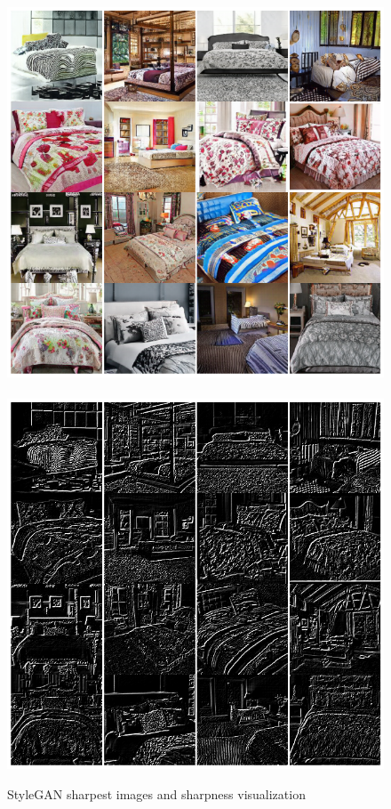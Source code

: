 \documentclass{article}
\begin{document}
        \begin{figure}[H]
          \centering
          \includegraphics[scale=0.28]{sharpness-images/moresharpness_style.png}
          \ \ 
          \includegraphics[scale=0.28]{sharpness-images/moresharpness_lines_style.png}\\
          \caption{StyleGAN sharpest images and sharpness visualization}
        \end{figure}
    
\end{document}
